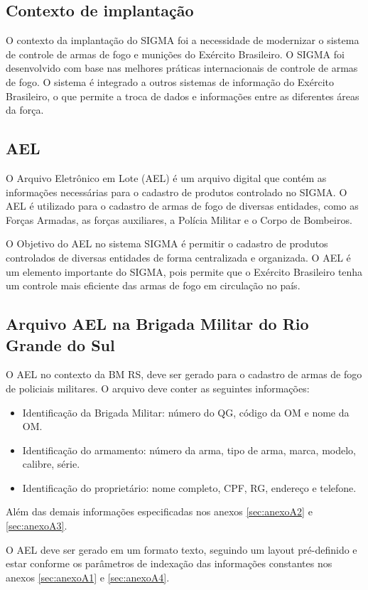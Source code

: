 \subsection{Contexto de implantação}
O contexto da implantação do SIGMA foi a necessidade de modernizar o sistema de controle de armas de fogo e munições do Exército Brasileiro.
O SIGMA foi desenvolvido com base nas melhores práticas internacionais de controle de armas de fogo. O sistema é integrado a outros sistemas de informação do Exército Brasileiro, o que permite a troca de dados e informações entre as diferentes áreas da força\cite{fenemeReunixE3oSobre}.

\subsection{AEL}
O Arquivo Eletrônico em Lote (AEL) é um arquivo digital que contém as informações necessárias para o cadastro de produtos controlado no SIGMA.
O AEL é utilizado para o cadastro de armas de fogo de diversas entidades, como as Forças Armadas, as forças auxiliares, a Polícia Militar e o Corpo de Bombeiros\cite{ExércitoBrasileiro}.

O Objetivo do AEL no sistema SIGMA é permitir o cadastro de produtos controlados de diversas entidades de forma centralizada e organizada. O AEL é um elemento importante do SIGMA, pois permite que o Exército Brasileiro tenha um controle mais eficiente das armas de fogo em circulação no país\cite{ExércitoBrasileiro}.

\subsection{Arquivo AEL na Brigada Militar do Rio Grande do Sul}
O AEL no contexto da BM RS, deve ser gerado para o cadastro de armas de fogo de policiais militares. O arquivo deve conter as seguintes informações:
\begin{itemize}
    \item Identificação da Brigada Militar: número do QG, código da OM e nome da OM.
    \item Identificação do armamento: número da arma, tipo de arma, marca, modelo, calibre, série.
    \item Identificação do proprietário: nome completo, CPF, RG, endereço e telefone.
\end{itemize}
Além das demais informações especificadas nos anexos \ref{sec:anexoA2} e \ref{sec:anexoA3}.

O AEL deve ser gerado em um formato texto, seguindo um layout pré-definido e estar conforme os parâmetros de indexação das informações constantes nos anexos \ref{sec:anexoA1} e \ref{sec:anexoA4}.

